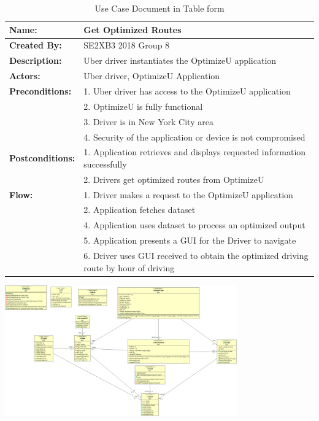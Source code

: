\documentclass[12pt]{article}
\begin{document}
\begin{table}[H]
 \centering
  \begin{adjustbox}{max width=\textwidth}
  \begin{tabular}{*{2}{|l}|}
  \hline
  \textbf{Name:} & Get Optimized Routes\\
  \hline
  \textbf{Created By:} & SE2XB3 2018 Group 8\\
  \hline
  \textbf{Description:} & Uber driver instantiates the OptimizeU application\\
  \hline
  \textbf{Actors:} & Uber driver, OptimizeU Application\\
  \hline
  \textbf{Preconditions:} & 1. Uber driver has access to the OptimizeU application\\
  						  & 2. OptimizeU is fully functional\\
  						  & 3. Driver is in New York City area\\
  						  &	4. Security of the application or device is not compromised\\
  \hline
  \textbf{Postconditions:} & 1. Application retrieves and displays requested information successfully\\
                          & 2. Drivers get optimized routes from OptimizeU\\
  \hline
  \textbf{Flow:} & 1. Driver makes a request to the OptimizeU application\\
                 & 2. Application fetches dataset\\
                 & 4. Application uses dataset to process an optimized output\\
                 & 5. Application presents a GUI for the Driver to navigate\\
                 & 6. Driver uses GUI received to obtain the optimized driving route by hour of driving\\
  \hline
\end{tabular}
\end{adjustbox}
  \caption{Use Case Document in Table form}
  \label{usecase}
\end{table}
\includegraphics[width=100mm,scale=0.9]{UML.png}
\end{document}
